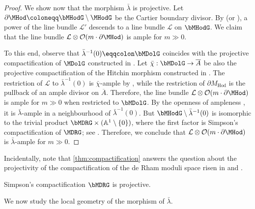 \begin{proof}
We show now that the morphism $\bar{\lambda}$ is projective.
Let $\partial\MHod \coloneqq \bMHodG \setminus \MHodG$ be the Cartier boundary divisor. By \cite[Th.\,2.3]{DN89} (or \cite[Proof of Prop.\,3.2.2]{deCataldo2020}), a power of the line bundle $\mathcal{L}'$ descends to a line bundle $\mathcal{L}$ on $\bMHodG$. We claim that the line bundle $\mathcal{L}\otimes \mathcal{O}(m\cdot \partial\MHod)$ is ample for $m \gg 0$.

To this end, observe that $\bar{\lambda}^{-1}(0) \eqqcolon \bMDolG$ coincides with the projective compactification of $\MDolG$ constructed in \cite[Th.\,3.1.1(1)]{deCataldo2020}. Let $\bar{\chi}: \bMDolG \to \overline{A}$ be also the projective compactification of the Hitchin morphism constructed in \cite[Th.\,3.1.1(2)]{deCataldo2020}. The restriction of $\mathcal{L}$ to $\bar{\lambda}^{-1}(0)$ is $\bar{\chi}$-ample by \cite[Prop.\,3.2.2]{deCataldo2020}, while the restriction of $\partial M_{\mathrm{Hod}}$ is the pullback of an ample divisor on $\overline{A}$. Therefore, the line bundle $\mathcal{L}\otimes \mathcal{O}(m \cdot \partial\MHod)$ is ample for $m \gg 0$ when restricted to $\bMDolG$. By the openness of ampleness \cite[Th.\,1.2.17]{Lazarsfeld2004}, it is $\bar{\lambda}$-ample in a neighbourhood of $\bar{\lambda}^{-1}(0)$. But $\bMHodG \setminus \bar{\lambda}^{-1}(0)$ is isomorphic to the trivial product $\bMDRG \times (\mathbb{A}^1 \setminus \{0\})$, where the first factor is Simpson's compactification of $\MDRG$; see \cite[\S 11]{Simpson1997}. Therefore, we conclude that $\mathcal{L}\otimes \mathcal{O}(m\cdot \partial\MHod)$ is $\bar{\lambda}$-ample for $m\gg0$.
\end{proof}

Incidentally, note that \cref{thm:compactification} answers the question about the projectivity of the compactification of the de Rham moduli space risen in \cite[p.\,268]{Simpson1997} and \cite[Rem.\,3.1.2]{deCataldo2020}.
\begin{cor}\label{cor:compactificationdeRhamproj}
Simpson's compactification $\bMDRG$ is projective.
\end{cor}
We now study the local geometry of the morphism of $\bar{\lambda}$.

